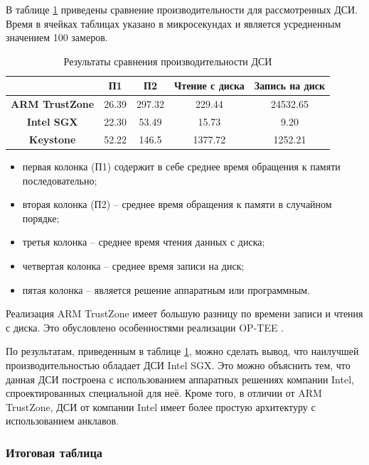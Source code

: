 В таблице \ref{table:perf} приведены сравнение производительности для рассмотренных ДСИ. Время в ячейках таблицах указано в микросекундах и является усредненным значением 100 замеров.

\begin{table}[!htb]
	\begin{center}
		\caption{Результаты сравнения производительности ДСИ}
		\label{table:perf}
		\begin{tabular}{|c|c|c|c|c|}
			\hline
			& \bfseries П1 & \bfseries П2  & \bfseries Чтение с диска & \bfseries Запись на диск\\
			\hline
			\bfseries ARM TrustZone & 26.39 & 297.32 & 229.44 & 24532.65 \\ \hline
			\bfseries Intel SGX & 22.30 & 53.49 & 15.73 & 9.20 \\ \hline
			\bfseries Keystone & 52.22 & 146.5 & 1377.72 & 1252.21 \\ \hline	
		\end{tabular}
	\end{center}
\end{table}

\begin{itemize}
	\item первая колонка (П1) содержит в себе среднее время обращения к памяти последовательно;
	\item вторая колонка (П2) -- среднее время обращения к памяти в случайном порядке;
	\item третья колонка -- среднее время чтения данных с диска;
	\item четвертая колонка -- среднее время записи на диск;
	\item пятая колонка -- является решение аппаратным или программным.
\end{itemize}

Реализация ARM TrustZone имеет большую разницу по времени записи и чтения с диска. Это обусловлено особенностями реализации OP-TEE \cite{comparsion-perf}.

По результатам, приведенным в таблице \ref{table:perf}, можно сделать вывод, что наилучшей производительностью обладает ДСИ Intel SGX. Это можно объяснить тем, что данная ДСИ построена с использованием аппаратных решениях компании Intel, спроектированных специальной для неё. Кроме того, в отличии от ARM TrustZone, ДСИ от компании Intel имеет более простую архитектуру с использованием анклавов.

\subsubsection{Итоговая таблица}

